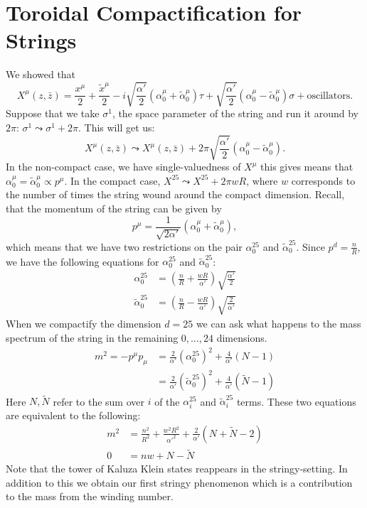 \documentclass{report}
\theoremstyle{plain}
\theoremstyle{definition}
\theoremstyle{remark}
\newcommand{\FR}[2]{\frac{#1}{#2}}
\newcommand{\SFR}[2]{\sqrt{\frac{#1}{#2}}}
\newcommand{\sg}{\sigma}
\begin{document}
\section{Toroidal Compactification for Strings}

We showed that \[X^\mu(z,\bar z) = \FR{x^\mu}{2} + \FR{\tilde x^\mu}{2}
-i\SFR{\alpha'}{2}(\alpha_0^\mu + \tilde \alpha_0^\mu)\tau
+ \SFR{\alpha'}{2}(\alpha_0^\mu - \tilde \alpha_0^\mu)\sg
+ \text{oscillators}.\]
Suppose that we take $\sg^1$, the space parameter of the string and run it
around by $2\pi$: $\sg^1 \leadsto \sg^1+2\pi$. This will get us:
\[X^\mu(z,\bar z) \leadsto X^\mu(z,\bar
z)+2\pi\SFR{\alpha'}{2}(\alpha_0^\mu - \tilde\alpha_0^\mu).\]
In the non-compact case, we have single-valuedness of $X^\mu$ this gives
means that $\alpha_0^\mu = \tilde\alpha_0^\mu\propto p^\mu$. In the compact
case, $X^{25} \leadsto X^{25} + 2\pi wR$, where $w$ corresponds to the number
of times the string wound around the compact dimension.  Recall, that the
momentum of the string can be given by \[p^\mu = \FR{1}{\sqrt{2\alpha'}}
(\alpha_0^\mu+\tilde\alpha_0^\mu),\] which means that we have two
restrictions on the pair $\alpha_0^{25}$ and $\tilde\alpha_0^{25}$. Since
$p^d = \FR{n}{R}$, we have the following equations for $\alpha_0^{25}$ and
$\tilde\alpha_0^{25}$:
\begin{align*}
    \alpha_0^{25} &= \left( \FR{n}{R}+\FR{wR}{\alpha'} \right)
    \SFR{\alpha'}{2}\\
    \tilde\alpha_0^{25}&= \left( \FR{n}{R}-\FR{wR}{\alpha'} \right)
    \SFR{2}{\alpha'}
\end{align*}
When we compactify the dimension $d=25$ we can ask what happens to the
mass spectrum of the string in the remaining $0,\dots,24$ dimensions.
\begin{align*}
    m^2 = -p^\mu p_\mu 
&= \FR{2}{\alpha'}(\alpha_0^{25})^2 + \FR{4}{\alpha'}(N-1)\\
&= \FR{2}{\alpha'}(\tilde\alpha_0^{25})^2 + \FR{4}{\alpha'}(\tilde N-1)
\end{align*}
Here $N,\tilde N$ refer to the sum over $i$ of the $\alpha_i^{25}$ and
$\tilde\alpha_i^{25}$ terms. These two equations are equivalent to the
following:
\begin{align}
    m^2 &= \FR{n^2}{R^2} + \FR{w^2R^2}{\alpha'^2} + \FR{2}{\alpha'}(N +
    \tilde N - 2)\\
    0&= nw + N-\tilde N
    \label{massspectrum-tduality}
\end{align}
Note that the tower of Kaluza Klein states reappears in the
stringy-setting. In addition to this we obtain our first stringy phenomenon
which is a contribution to the mass from the winding number.
\end{document}
